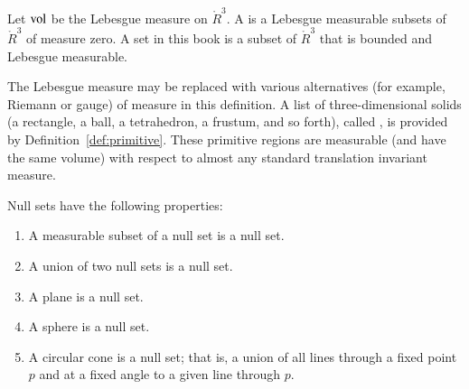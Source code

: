 
\begin{definition}
Let ${\operatorname{vol}}$ be the Lebesgue measure
on $\ring{R}^3$. 
A  is a 
Lebesgue measurable subsets of $\ring{R}^3$ of measure zero.
A  set in this book is a subset of $\ring{R}^3$ that
is bounded and Lebesgue measurable.
\end{definition}
%
%

\begin{remark}[]
The Lebesgue measure may
  be replaced with various alternatives (for example, Riemann or gauge) of measure in this definition.  
A list of three-dimensional solids  
(a rectangle, a ball, a tetrahedron, a frustum, and so forth),
called , is provided by Definition~\ref{def:primitive}.  These
primitive regions are measurable (and have the same volume) 
with respect to almost any standard translation invariant measure.  
\end{remark}

\begin{lemma}\label{lemma:null}
Null sets have the following  properties:
\begin{enumerate}%
\item A measurable subset of a null set is a null set.
\item A union of two null sets is a null set.
\item A plane is a null set.
\item A sphere is a null set.
\item A circular cone is a null set; that is, a union of all
lines through a fixed point $p$ and at
a fixed angle to a given line through $p$.
\label{enum:null}
%
%
%
%
\end{enumerate}
\end{lemma}
%

%



